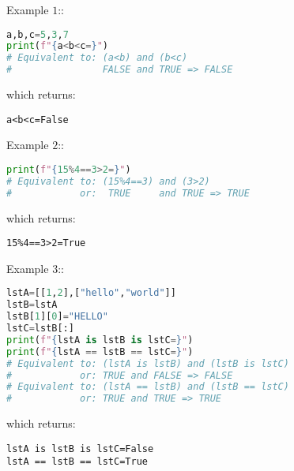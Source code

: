 \documentclass[10pt]{article}
\begin{document}
\begin{itemize}
Example $1$::
\begin{lstlisting}[language=python]
a,b,c=5,3,7
print(f"{a<b<c=}")
# Equivalent to: (a<b) and (b<c)
#                FALSE and TRUE => FALSE
\end{lstlisting}
which returns:
\begin{verbatim}
a<b<c=False
\end{verbatim}


Example $2$::
\begin{lstlisting}[language=python]
print(f"{15%4==3>2=}")
# Equivalent to: (15%4==3) and (3>2)
#            or:  TRUE     and TRUE => TRUE
\end{lstlisting}
which returns:
\begin{verbatim}
15%4==3>2=True
\end{verbatim}


Example $3$::
\begin{lstlisting}[language=python]
lstA=[[1,2],["hello","world"]]
lstB=lstA
lstB[1][0]="HELLO"
lstC=lstB[:]
print(f"{lstA is lstB is lstC=}")
print(f"{lstA == lstB == lstC=}")
# Equivalent to: (lstA is lstB) and (lstB is lstC)
#            or: TRUE and FALSE => FALSE
# Equivalent to: (lstA == lstB) and (lstB == lstC)
#            or: TRUE and TRUE => TRUE
\end{lstlisting}
which returns:
\begin{verbatim}
lstA is lstB is lstC=False
lstA == lstB == lstC=True
\end{verbatim}

\end{itemize}



\end{document}
